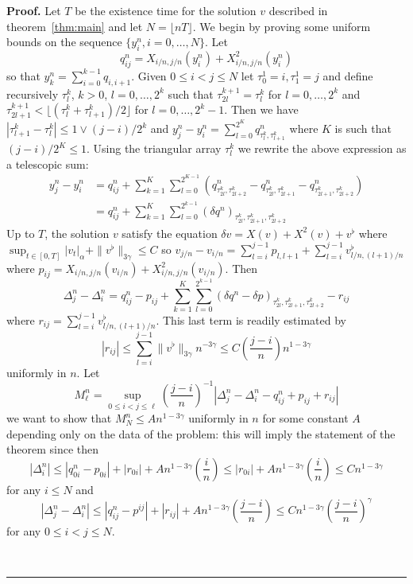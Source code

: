\documentclass[a4paper,11pt,reqno]{article}
\newcommand{\der}{\delta}
\newenvironment{proof}[1][Proof]{\textbf{#1.} }{\ \rule{0.5em}{0.5em}}
\begin{document}
\begin{proof}
Let $T$ be the existence time for the solution $v$ described in theorem~\ref{thm:main} and let $N = \lfloor nT \rfloor$.
We begin by proving some uniform bounds on the sequence
$\{y^n_i,i=0,\dots,N\}$.   Let
$$
q^n_{ij} = X_{i/n, j/n}(y^n_{i}) +  X^2_{i/n, j/n}(y^n_{i})
$$
so that $y^n_k =\sum_{i=0}^{k-1} q_{i,i+1}$. Given $0\le i<j\le N$ let
$\tau^1_0=i, \tau^1_1=j$ and define recursively  $\tau^k_l$, $k >
0$, $l =0,\dots,2^k$ such that $\tau^{k+1}_{2l} = \tau^k_l$  for
$l=0,\dots,2^k$ and 
$\tau^{k+1}_{2l+1}<\lfloor (\tau^{k}_{l}+\tau^{k}_{l+1})/2\rfloor$ for
$l=0,\dots,2^k-1$. 
Then we have $|\tau^k_{l+1}-\tau^k_l|\le 1 \vee (j-i)/2^k$
and
$
y^n_j-y^n_i =\sum_{l=0}^{2^K} q^n_{\tau^k_l,\tau^k_{l+1}} 
$
 where $K$ is such that
$(j-i)/2^K \le 1$. Using the triangular array $\tau^k_l$ we 
rewrite the above expression as a telescopic sum:
\begin{equation*}
  \begin{split}
y^n_j-y^n_i & = q^n_{ij} + \sum_{k=1}^K \sum_{l=0}^{2^{K-1}} (q^n_{\tau^k_{2l},\tau^k_{2l+2}}-q^n_{\tau^k_{2l},\tau^k_{2l+1}}-q^n_{\tau^k_{2l+1},\tau^k_{2l+2}}) 
  \\ & = q^n_{ij} + \sum_{k=1}^K \sum_{l=0}^{2^{k-1}} (\der q^n)_{\tau^k_{2l},\tau^k_{2l+1},\tau^k_{2l+2}}   
  \end{split}
\end{equation*}
Up to $T$, the solution $v$ satisfy the equation
$
\der v = X(v) + X^2(v) + v^\flat
$
where $\sup_{t\in[0,T]}|v_t|_\alpha+\|v^\flat\|_{3\gamma}\le C$ so
$
v_{j/n}-v_{i/n} = \sum_{l=i}^{j-1} p_{l,l+1} + \sum_{l=i}^{j-1} v^\flat_{l/n,(l+1)/n}
$
where $p_{ij}=X_{i/n,j/n}(v_{i/n})+ X^2_{i/n,j/n}(v_{i/n})$.
Then
\begin{equation*}
\Delta^n_{j}-\Delta^n_{i} =  q^n_{ij}-p_{ij}  + \sum_{k=1}^K \sum_{l=0}^{2^{k-1}} (\der
q^n- \der p)_{\tau^k_{2l},\tau^k_{2l+1},\tau^k_{2l+2}}  - r_{ij}
\end{equation*}
where
$
r_{ij}=  \sum_{l=i}^{j-1} v^\flat_{l/n,(l+1)/n}
$.
This last term is readily estimated by
$$
|r_{ij}| \le \sum_{l=i}^{j-1} \|v^\flat\|_{3\gamma} n^{-3\gamma}
 \le C \left(\frac{j-i}{ n}\right) n^{1-3\gamma}
$$
uniformly in $n$.
Let 
$$
M^n_\ell = \sup_{0\le i < j \le \ell} \left(\frac{j-i}{ n}\right)^{-1} |\Delta^n_{j}-\Delta^n_{i} -  q^n_{ij}+p_{ij}+r_{ij}|
$$
we want to show that $M^n_N \le A n^{1-3\gamma}$ uniformly in $n$ for some constant
$A$ depending only on the data of the problem: this will imply the
statement of the theorem since then
$$
|\Delta^n_{i}| \le |q^n_{0i}-p_{0i}| + |r_{0i}| + A n^{1-3\gamma}
\left(\frac{i}{ n}\right)  \le |r_{0i}| + A n^{1-3\gamma}
\left(\frac{i}{ n}\right) \le Cn^{1-3\gamma}
$$
for any $i \le N$ and
$$
|\Delta^n_{j}-\Delta^n_{i}| \le |q^n_{ij}-p^{ij}| + |r_{ij}| + A n^{1-3\gamma}
\left(\frac{j-i}{ n}\right)  \le C n^{1-3\gamma} \left(\frac{j-i}{ n}\right)^\gamma
$$
for any $0\le i<j\le N$.



\end{proof}
\end{document}
